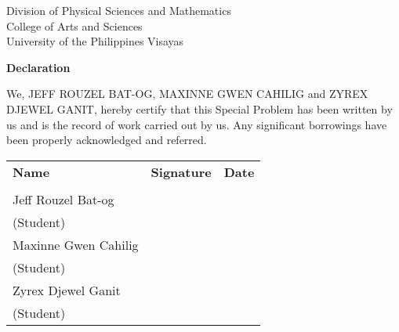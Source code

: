 \begin{center}
	Division of Physical Sciences and Mathematics\\
	College of Arts and Sciences\\
	University of the Philippines Visayas 
	
		\textbf{Declaration}
		\end{center}

We,  JEFF ROUZEL BAT-OG, MAXINNE GWEN CAHILIG and ZYREX DJEWEL GANIT, hereby certify that this Special Problem has been written by us  and is the record of work carried out by us. Any significant borrowings have been properly acknowledged and referred.

	\begin{tabular}{lll}
	\bfseries Name  & \bfseries Signature & \bfseries Date\\ \\
	Jeff Rouzel Bat-og &\signaturerule  & \signaturerule\\ 
	\multicolumn{1}{l}{(Student)} \\ 
	Maxinne Gwen Cahilig &\signaturerule  & \signaturerule\\ 
	\multicolumn{1}{l}{(Student)} \\
	Zyrex Djewel Ganit &\signaturerule  & \signaturerule\\ 
\multicolumn{1}{l}{(Student)} \\

\end{tabular}




